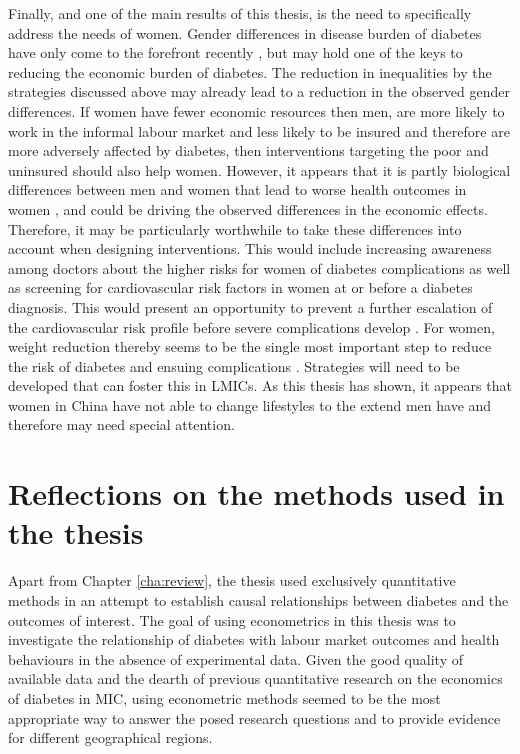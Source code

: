 Finally, and one of the main results of this thesis, is the need to specifically address the needs of women. Gender differences in disease burden of diabetes have only come to the forefront recently \parencite{Peters2015}, but may hold one of the keys to reducing the economic burden of diabetes. The reduction in inequalities by the strategies discussed above may already lead to a reduction in the observed gender differences. If women have fewer economic resources then men, are more likely to work in the informal labour market and less likely to be insured \parencite{Galli2008} and therefore are more adversely affected by diabetes, then interventions targeting the poor and uninsured should also help women. However, it appears that it is partly biological differences between men and women that lead to worse health outcomes in women \parencite{Peters2015,Peters2014a,Peters2014,Bertram2010}, and could be driving the observed differences in the economic effects. Therefore, it may be particularly worthwhile to take these differences into account when designing interventions. This would include increasing awareness among doctors about the higher risks for women of diabetes complications as well as screening for cardiovascular risk factors in women at or before a diabetes diagnosis. This would present an opportunity to prevent a further escalation of the cardiovascular risk profile before severe complications develop \parencite{Peters2015}. For women, weight reduction thereby seems to be the single most important step to reduce the risk of diabetes and ensuing complications \parencite{Peters2015}. Strategies will need to be developed that can foster this in \acp{LMIC}. As this thesis has shown, it appears that women in China have not able to change lifestyles to the extend men have and therefore may need special attention.


\section{Reflections on the methods used in the thesis}

Apart from Chapter \ref{cha:review}, the thesis used exclusively quantitative methods in an attempt to establish causal relationships between diabetes and the outcomes of interest. The goal of using econometrics in this thesis was to investigate the relationship of diabetes with labour market outcomes and health behaviours in the absence of experimental data. Given the good quality of available data and the dearth of previous quantitative research on the economics of diabetes in \ac{MIC}, using econometric methods seemed to be the most appropriate way to answer the posed research questions and to provide evidence for different geographical regions.

